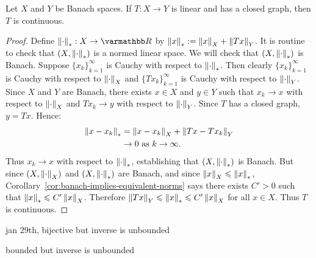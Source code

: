 \begin{theorem}\label{thm:closed-graph-thm}
Let $X$ and $Y$ be Banach spaces. If $T:X \rightarrow Y$ is linear and has a closed graph, then $T$ is continuous.
\end{theorem}
    \begin{proof}
        Define $\lnorm \cdot \rnorm_\ast:X \rightarrow \bfR$ by $\left\lVert x \right\rVert_\ast := \left\lVert x \right\rVert_X + \left\lVert T x \right\rVert_Y$. It is routine to check that $(X,\left\lVert \cdot \right\rVert_\ast)$ is a normed linear space. We will check that $(X,\left\lVert \cdot \right\rVert_\ast)$ is Banach. Suppose $\{x_k\}_{k = 1}^\infty$ is Cauchy with respect to $\left\lVert \cdot \right\rVert_\ast$. Then clearly $\{x_k\}_{k = 1}^\infty$ is Cauchy with respect to $\left\lVert \cdot \right\rVert_X$ and $\{Tx_k\}_{k = 1}^\infty$ is Cauchy with respect to $\left\lVert \cdot \right\rVert_Y$. Since $X$ and $Y$ are Banach, there exists $x \in X$ and $y \in Y$ such that $x_k \rightarrow x$ with respect to $\left\lVert \cdot \right\rVert_X$ and $T x_k \rightarrow y$ with respect to $\left\lVert \cdot \right\rVert_Y$. Since $T$ has a closed graph, $y = Tx$. Hence:
            \begin{equation*}
            \begin{split}
                \left\lVert x - x_k \right\rVert_\ast
                & = \left\lVert x - x_k \right\rVert_X + \left\lVert Tx - Tx_k \right\rVert_Y \\ 
                & \rightarrow 0 \text{ as }k \rightarrow \infty.
            \end{split}
            \end{equation*}
        Thus $x_k \rightarrow x$ with respect to $\left\lVert \cdot \right\rVert_\ast$, establishing that $(X,\left\lVert \cdot \right\rVert_\ast)$ is Banach. But since $(X,\left\lVert \cdot \right\rVert_X)$ and $(X,\left\lVert \cdot \right\rVert_\ast)$ are Banach, and since $\left\lVert x \right\rVert_X \leqslant \left\lVert x \right\rVert_\ast$, Corollary~\ref{cor:banach-implies-equivalent-norms} says there exists $C' > 0$ such that $\left\lVert x \right\rVert_\ast \leqslant C' \left\lVert x \right\rVert_X$. Therefore $\left\lVert T x \right\rVert_Y \leqslant \left\lVert x \right\rVert_\ast \leqslant C' \left\lVert x \right\rVert_X$ for all $x \in X$. Thus $T$ is continuous.
    \end{proof}

\begin{example}
{\color{red} jan 29th, bijective but inverse is unbounded}
\end{example}
\begin{example}
{\color{red} bounded but inverse is unbounded}
\end{example}

